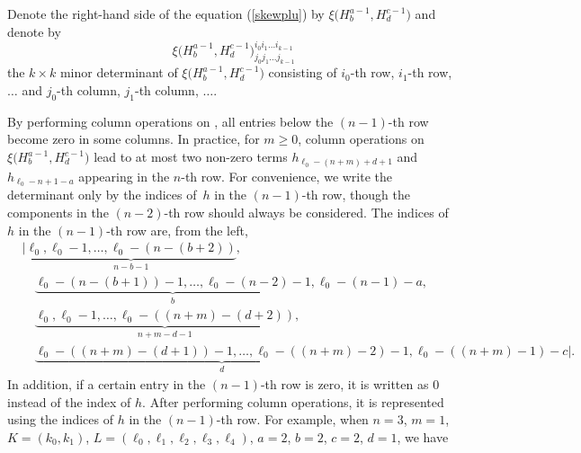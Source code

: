 \documentclass[10pt,a4paper]{amsart}
\numberwithin{equation}{section}
\begin{document}
Denote the right-hand side of the equation (\ref{skewplu}) by $\xi\bigl(H^{a-1}_{b},H^{c-1}_{d}\bigr)$ and denote by
\[
\xi\bigl(H^{a-1}_{b},H^{c-1}_{d}\bigr)^{i_0 i_1 \dots i_{k-1}}_{j_0 j_1 \dots j_{k-1}}
\]
the $k\times k$ minor determinant of $\xi\bigl(H^{a-1}_{b},H^{c-1}_{d}\bigr)$ consisting of $i_0$-th row, $i_1$-th row, $\dots$ and $j_0$-th column, $j_1$-th column, $\dots$.

By performing column operations on , all entries below the $(n-1)$-th row become zero in some columns.
In practice, for $m\geq0$, column operations on $\xi\bigl(H^{a-1}_{b},H^{c-1}_{d}\bigr)$ lead to at most two non-zero terms
$h_{\ell_{0}-(n+m)+d+1}$ and $h_{\ell_{0}-n+1-a}$ appearing in the $n$-th row. For convenience, we write the determinant  only by the indices of~$h$ in the $(n-1)$-th row, though the components in the $(n-2)$-th row should always be considered.
The indices of~$h$ in the $(n-1)$-th row are, from the left,
\begin{align}
&| \underbrace{\ell_{0},\ell_{0}-1,\dots,\ell_{0}-(n-(b+2))}_{n-b-1},\nonumber\\
&\quad{}\underbrace{\ell_{0}-(n-(b+1))-1,\dots,\ell_{0}-(n-2)-1}_{b},\ell_{0}-(n-1)-a,\nonumber\\
&\quad{}\underbrace{\ell_{0},\ell_{0}-1,\dots,\ell_{0}-((n+m)-(d+2))}_{n+m-d-1},\nonumber\\
&\quad{}\underbrace{\ell_{0}-((n+m)-(d+1))-1,\dots,\ell_{0}-((n+m)-2)-1}_{d},\ell_{0}-((n+m)-1)-c |.\label{ind}
\end{align}
In addition, if a certain entry in the $(n-1)$-th row is zero, it is written as $0$ instead of the index of $h$. After performing column operations, it is represented using the indices of $h$ in the $(n-1)$-th row. For example, when $n=3$, $m=1$, $K=(k_0,k_1)$, $L=(\ell_{0},\ell_{1},\ell_{2},\ell_{3},\ell_4)$, $a=2$, $b=2$, $c=2$, $d=1$, we have
\end{document}
